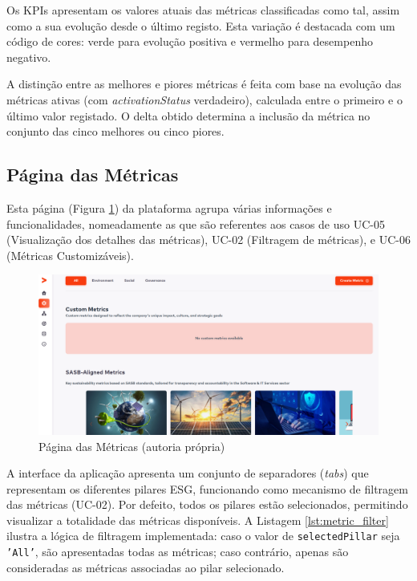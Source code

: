 Os KPIs apresentam os valores atuais das métricas classificadas como tal, assim como a sua evolução desde o último registo. Esta variação é destacada com um código de cores: verde para evolução positiva e vermelho para desempenho negativo.

A distinção entre as melhores e piores métricas é feita com base na evolução das métricas ativas (com \textit{activationStatus} verdadeiro), calculada entre o primeiro e o último valor registado. O delta obtido determina a inclusão da métrica no conjunto das cinco melhores ou cinco piores.

\subsection{Página das Métricas}

Esta página (Figura \ref{fig:metric_done}) da plataforma agrupa várias informações e funcionalidades, nomeadamente as que são referentes aos casos de uso UC-05 (Visualização dos detalhes das métricas), UC-02 (Filtragem de métricas), e UC-06 (Métricas Customizáveis).

\begin{figure}[H]
    \centering
    \includegraphics[width=\linewidth,keepaspectratio]{frontmatter/assets/platform_prints/metrics/metrics_done.png}
    \caption{Página das Métricas (autoria própria)}
    \label{fig:metric_done}
\end{figure}

A interface da aplicação apresenta um conjunto de separadores (\textit{tabs}) que representam os diferentes pilares ESG, funcionando como mecanismo de filtragem das métricas (UC-02). Por defeito, todos os pilares estão selecionados, permitindo visualizar a totalidade das métricas disponíveis. A Listagem \ref{lst:metric_filter} ilustra a lógica de filtragem implementada: caso o valor de \texttt{selectedPillar} seja \texttt{'All'}, são apresentadas todas as métricas; caso contrário, apenas são consideradas as métricas associadas ao pilar selecionado.

